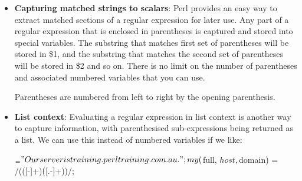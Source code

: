 \documentclass{report}
\begin{document}
\begin{itemize}
\begin{itemize}
            \end{itemize}
        \item \textbf{Capturing matched strings to scalars}: Perl provides an easy way to extract matched sections of a regular expression for later use. Any part of a regular expression that is enclosed in parentheses is captured and stored into special variables. The substring that matches first set of parentheses will be stored in \$1, and the substring that matches the second set of parentheses will be stored in \$2 and so on. There is no limit on the number of parentheses and associated numbered variables that you can use.
            \bigbreak \noindent 
            \bigbreak \noindent 
            Parentheses are numbered from left to right by the opening parenthesis.
        \item \textbf{List context}: Evaluating a regular expression in list context is another way to capture information, with parenthesised sub-expressions being returned as a list. We can use this instead of numbered variables if we like:
            \bigbreak \noindent 
            \begin{perlcode}
                $_ = "Our server is training.perltraining.com.au.";
                my ($full, $host, $domain) = /(([\w-]+)\.([\w.-]+))/;


\end{perlcode}
\end{itemize}
\end{document}
